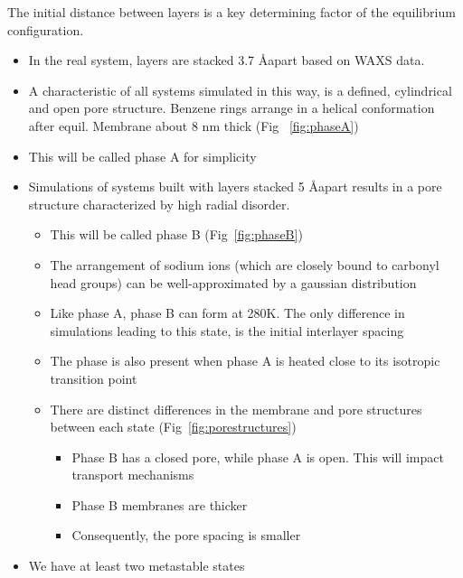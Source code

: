 \documentclass{article}
\newcommand{\angstrom}{\textup{\AA}}
\begin{document}
	The initial distance between layers is a key determining factor of the equilibrium configuration.
	\begin{itemize}
                \item In the real system, layers are stacked 3.7 \angstrom apart based on WAXS data. 
                \item A characteristic of all systems simulated in this way, is a defined, cylindrical and open pore structure. Benzene rings arrange in a helical conformation after equil. Membrane about 8 nm thick (Fig ~\ref{fig:phaseA}) %
                \item This will be called phase A for simplicity  
	        \item Simulations of systems built with layers stacked 5 \angstrom apart results in a pore structure characterized by high radial disorder.
        	\begin{itemize}
                	\item This will be called phase B (Fig~\ref{fig:phaseB})
                	\item The arrangement of sodium ions (which are closely bound to carbonyl head groups) can be well-approximated by a gaussian distribution 
                	\item Like phase A, phase B can form at 280K. The only difference in simulations leading to this state, is the initial interlayer spacing
                	\item The phase is also present when phase A is heated close to its isotropic transition point
                	\item There are distinct differences in the membrane and pore structures between each state (Fig~\ref{fig:porestructures})
                	\begin{itemize}
                        	\item Phase B has a closed pore, while phase A is open. This will impact transport mechanisms
                        	\item Phase B membranes are thicker
                        	\item Consequently, the pore spacing is smaller
                	\end{itemize}
		\end{itemize}
                \item We have at least two metastable states
        \end{itemize}
\end{document}
